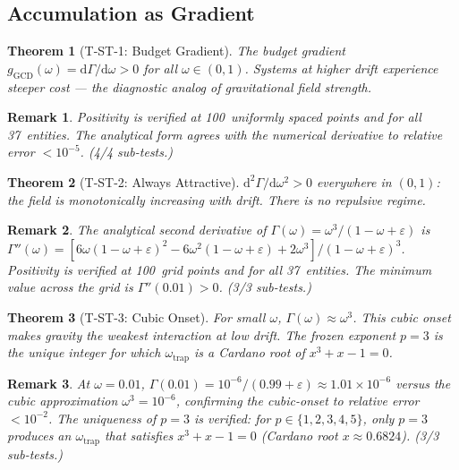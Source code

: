 \documentclass[
  aps,
  prd,
  twocolumn,
  superscriptaddress,
  nofootinbib,
  floatfix
]{revtex4-2}
\newtheorem{theorem}{Theorem}
\newtheorem{remark}{Remark}
\newcommand{\Gam}{\Gamma}
\newcommand{\eps}{\varepsilon}
\newcommand{\dd}{\mathrm{d}}
\begin{document}
\subsection{Accumulation as Gradient}

\begin{theorem}[T-ST-1: Budget Gradient]\label{thm:T1}
The budget gradient
$g_{\mathrm{GCD}}(\omega) = \dd\Gam/\dd\omega > 0$
for all $\omega \in (0,1)$.  Systems at higher drift
experience steeper cost --- the diagnostic analog of
gravitational field strength.
\end{theorem}

\begin{remark}
Positivity is verified at 100~uniformly spaced points and
for all 37~entities.  The analytical form agrees with the
numerical derivative to relative error $< 10^{-5}$.
(4/4 sub-tests.)
\end{remark}

\begin{theorem}[T-ST-2: Always Attractive]\label{thm:T2}
$\dd^2\Gam/\dd\omega^2 > 0$ everywhere in $(0,1)$: the field
is monotonically increasing with drift.  There is no
repulsive regime.
\end{theorem}

\begin{remark}
The analytical second derivative of
$\Gam(\omega) = \omega^3/(1 - \omega + \eps)$ is
$\Gam''(\omega) = [6\omega(1{-}\omega{+}\eps)^2 -
6\omega^2(1{-}\omega{+}\eps) + 2\omega^3] /
(1{-}\omega{+}\eps)^3$.  Positivity is verified at
100~grid points and for all 37~entities.  The minimum
value across the grid is $\Gam''(0.01) > 0$.
(3/3 sub-tests.)
\end{remark}

\begin{theorem}[T-ST-3: Cubic Onset]\label{thm:T3}
For small $\omega$, $\Gam(\omega) \approx \omega^3$.  This
cubic onset makes gravity the weakest interaction at low drift.
The frozen exponent $p = 3$ is the unique integer for which
$\omega_{\mathrm{trap}}$ is a Cardano root of
$x^3 + x - 1 = 0$.
\end{theorem}

\begin{remark}
At $\omega = 0.01$, $\Gam(0.01) = 10^{-6}/(0.99 + \eps)
\approx 1.01 \times 10^{-6}$ versus the cubic approximation
$\omega^3 = 10^{-6}$, confirming the cubic-onset to
relative error $< 10^{-2}$.  The uniqueness of $p = 3$
is verified: for $p \in \{1, 2, 3, 4, 5\}$, only $p = 3$
produces an $\omega_{\mathrm{trap}}$ that satisfies
$x^3 + x - 1 = 0$ (Cardano root $x \approx 0.6824$).
(3/3 sub-tests.)
\end{remark}
\end{document}

